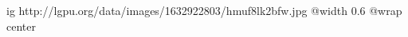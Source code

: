  
 
 
 
 

\ifcmt
  ig http://lgpu.org/data/images/1632922803/hmuf8lk2bfw.jpg
  @width 0.6
	@wrap center
\fi

